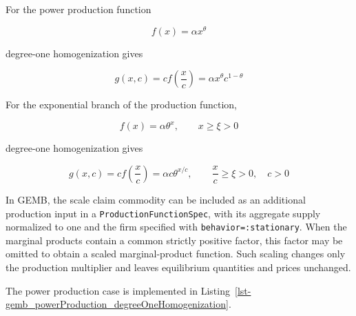 \documentclass[
  letterpaper,
  DIV=11,
  numbers=noendperiod]{scrreprt}
\begin{document}
For the power production function

\[
f(x)=\alpha x^\theta
\]

degree-one homogenization gives

\[
g(x,c)
=
c f\left(\frac{x}{c}\right)
=
\alpha x^\theta c^{1-\theta}
\]

For the exponential branch of the production function,

\[
f(x)=\alpha\theta^x,\qquad x\geq\xi>0
\]

degree-one homogenization gives

\[
g(x,c)
=
c f\left(\frac{x}{c}\right)
=
\alpha c\theta^{x/c},
\qquad
\frac{x}{c}\geq\xi>0,\quad c>0
\]

In GEMB, the scale claim commodity can be included as an additional
production input in a \texttt{ProductionFunctionSpec}, with its
aggregate supply normalized to one and the firm specified with
\texttt{behavior=:stationary}. When the marginal products contain a
common strictly positive factor, this factor may be omitted to obtain a
scaled marginal-product function. Such scaling changes only the
production multiplier and leaves equilibrium quantities and prices
unchanged.

The power production case is implemented in
Listing~\ref{lst-gemb_powerProduction_degreeOneHomogenization}.
\end{document}
